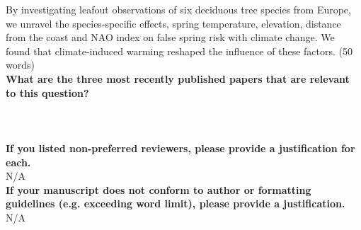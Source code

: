 \documentclass{article}\usepackage[]{graphicx}\usepackage[]{color}
\begin{document}
\noindent By investigating leafout observations of six deciduous tree species from Europe, we unravel the species-specific effects, spring temperature, elevation, distance from the coast and NAO index on false spring risk with climate change. We found that climate-induced warming reshaped the influence of these factors. (50 words) \\ 

\noindent \textbf{What are the three most recently published papers that are relevant to this question?} \\

\\
\\ 
\\

\noindent \textbf{ If you listed non-preferred reviewers, please provide a justification for each.} \\

\noindent N/A \\

\noindent \textbf{ If your manuscript does not conform to author or formatting guidelines (e.g. exceeding word limit), please provide a justification.} \\

\noindent N/A \\


\end{document}
